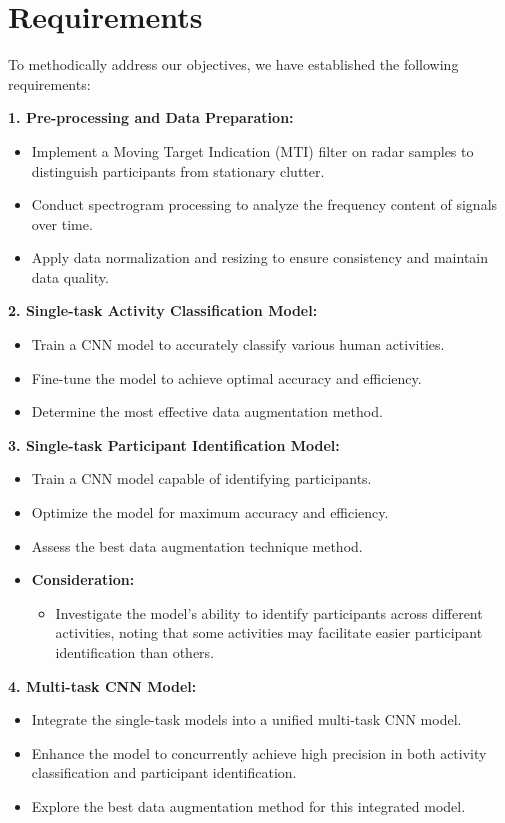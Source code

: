 \documentclass{l4proj}
\begin{document}
\section{Requirements}
To methodically address our objectives, we have established the following requirements:

\textbf{1. Pre-processing and Data Preparation:}
\begin{itemize}
    \item Implement a Moving Target Indication (MTI) filter on radar samples to distinguish participants from stationary clutter.
    \item Conduct spectrogram processing to analyze the frequency content of signals over time.
    \item Apply data normalization and resizing to ensure consistency and maintain data quality.
\end{itemize}

\textbf{2. Single-task Activity Classification Model:}
\begin{itemize}
    \item Train a CNN model to accurately classify various human activities.
    \item Fine-tune the model to achieve optimal accuracy and efficiency.
    \item Determine the most effective data augmentation method.
\end{itemize}

\textbf{3. Single-task Participant Identification Model:}
\begin{itemize}
    \item Train a CNN model capable of identifying participants.
    \item Optimize the model for maximum accuracy and efficiency.
    \item Assess the best data augmentation technique method.
    \item \textbf{Consideration:}
    \begin{itemize}
        \item Investigate the model's ability to identify participants across different activities, noting that some activities may facilitate easier participant identification than others.
    \end{itemize}
\end{itemize}

\textbf{4. Multi-task CNN Model:}
\begin{itemize}
    \item Integrate the single-task models into a unified multi-task CNN model.
    \item Enhance the model to concurrently achieve high precision in both activity classification and participant identification.
    \item Explore the best data augmentation method for this integrated model.
\end{itemize}
\end{document}
